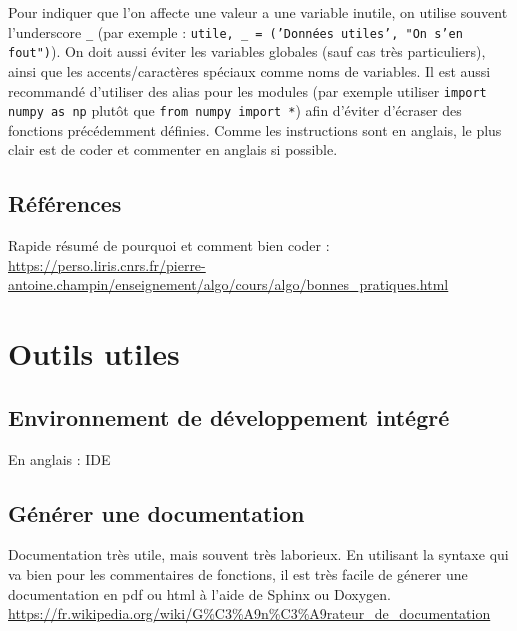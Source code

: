 \documentclass{article}
\begin{document}
Pour indiquer que l'on affecte une valeur a une variable inutile, on utilise souvent l'underscore \texttt{\_} (par exemple : \texttt{utile, \_ = ('Données utiles', "On s'en fout")}). On doit aussi éviter les variables globales (sauf cas très particuliers), ainsi que les accents/caractères spéciaux comme noms de variables. Il est aussi recommandé d'utiliser des alias pour les modules (par exemple utiliser \texttt{import numpy as np} plutôt que \texttt{from numpy import *}) afin d'éviter d'écraser des fonctions précédemment définies. Comme les instructions sont en anglais, le plus clair est de coder et commenter en anglais si possible.

\subsection*{Références}
Rapide résumé de pourquoi et comment bien coder :\\
\url{https://perso.liris.cnrs.fr/pierre-antoine.champin/enseignement/algo/cours/algo/bonnes_pratiques.html}




\section{Outils utiles}

\subsection*{Environnement de développement intégré}
En anglais : IDE

\subsection*{Générer une documentation}
Documentation très utile, mais souvent très laborieux. En utilisant la syntaxe qui va bien pour les commentaires de fonctions, il est très facile de génerer une documentation en pdf ou html à l'aide de Sphinx ou Doxygen.
\url{https://fr.wikipedia.org/wiki/G\%C3\%A9n\%C3\%A9rateur_de_documentation}
\end{document}
